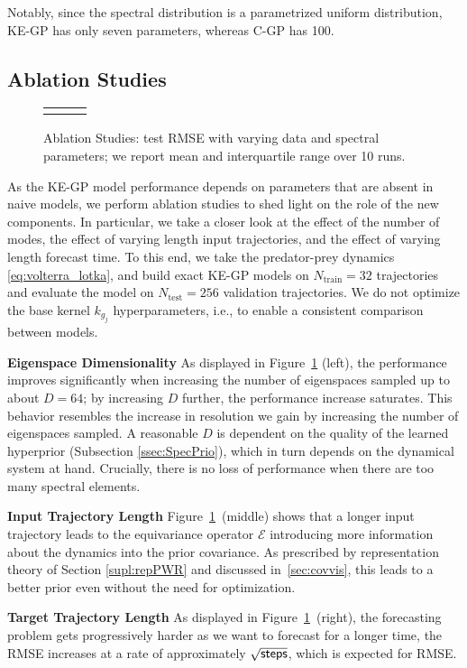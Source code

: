 Notably, since the spectral distribution is a parametrized uniform distribution, KE-GP has only seven parameters, whereas C-GP has 100.

\subsection{Ablation Studies}
\begin{figure}
    \centering
    \begin{tabular}{ccc}
         &
         & 
    \end{tabular}
    \caption{Ablation Studies: test RMSE with varying data and spectral parameters; we report mean and interquartile range over 10 runs.}
    \label{fig:abationES}
\end{figure}
As the KE-GP model performance depends on parameters that are absent in naive models, we perform ablation studies to shed light on the role of the new components. In particular, we take a closer look at the effect of the number of modes, the effect of varying length input trajectories, and the effect of varying length forecast time. To this end, we take the predator-prey dynamics \eqref{eq:volterra_lotka}, and 
build exact KE-GP models on $N_{\text{train}}=32$ trajectories and evaluate the model on $N_{\text{test}}=256$ validation trajectories. We do not optimize the base kernel $k_{g_j}$ hyperparameters, i.e., to enable a consistent comparison between models. 

\textbf{Eigenspace Dimensionality} As displayed in Figure~\ref{fig:abationES} (left), the performance improves significantly when increasing the number of eigenspaces sampled up to about $D=64$; by increasing $D$ further, the performance increase saturates. This behavior resembles the increase in resolution we gain by increasing the number of eigenspaces sampled. A reasonable $D$ is dependent on the quality of the learned hyperprior (Subsection \ref{ssec:SpecPrio}), which in turn depends on the dynamical system at hand. Crucially, there is no loss of performance when there are too many spectral elements.

\textbf{Input Trajectory Length} Figure~\ref{fig:abationES}~(middle) shows that a longer input trajectory leads to the equivariance operator $\mathcal{E}$ introducing more information about the dynamics into the prior covariance. As prescribed by representation theory of Section \ref{supl:repPWR} and discussed in~\ref{sec:covvis}, this leads to a better prior even without the need for optimization.

\textbf{Target Trajectory Length} As displayed in Figure~\ref{fig:abationES}~(right), the forecasting problem gets progressively harder as we want to forecast for a longer time, the RMSE increases at a rate of approximately $\sqrt{{\textsf{steps}}}$, which is expected for RMSE.%

\newpage






